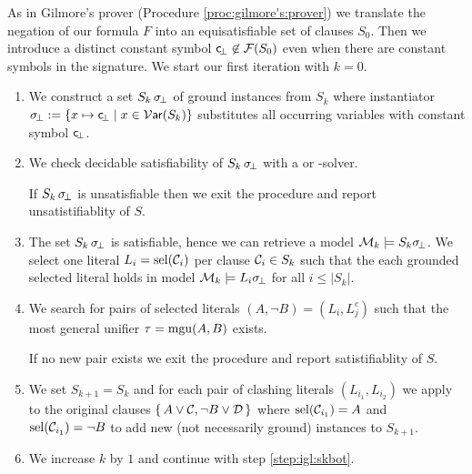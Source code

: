 \begin{procedure}\label{proc:inst:gen:loop}
	As in Gilmore's prover (Procedure \ref{proc:gilmore's:prover}) 
	we translate the negation of our formula $F$ into an equisatisfiable set of clauses 
	$S_0$. Then we introduce a distinct constant symbol 
	${\mathsf c}\!_\bot\not\in{\mathcal F}(S_0)$ even when there are constant symbols in the signature. 
	We start our first iteration with $k=0$.
	
	\begin{enumerate}
		\item\label{step:igl:skbot}
		We construct a set $S_{k}\,\sigma\!_\bot$ of ground instances from $S_k$
		where instantiator $\sigma\!_\bot := \{ x\mapsto {\mathsf c}\!_\bot \mid x\in\operatorname{\mathcal{V}\mathsf{ar}}(S_k) \} $ 
		substitutes all occurring variables with constant symbol ${\mathsf c}\!_\bot$.
%		
		\item\label{step:igl:sksat} We check decidable satisfiability of $S_k\,\sigma\!_\bot$ with a \SAT or \SMT-solver.
		
		If $S_k\,\sigma\!_\bot$ is unsatisfiable then we exit the procedure and report {\myem unsatistifiablity of $S$}.
		
		\item\label{step:igl:model} The set $S_k\,\sigma\!_\bot$ is satisfiable, hence we can retrieve a model ${\mathcal M}_k \models S_k\sigma\!_\bot$.
		We select one literal $L_i = \operatorname{sel}({\mathcal C}_i)$ per clause ${\mathcal C}_i \in S_k$ 
		such that the each grounded selected literal holds in model
		${\mathcal M}_k\models L_i\sigma\!_\bot$ for all $i\leq | S_k |$.
		
		\item\label{step:igl:clashes} We search for pairs of selected literals $(A, \lnot B) = (L_i, L_j^c)$
		such that the most general unifier $\tau = \operatorname{mgu}(A,B)$ exists.
		
		If no new pair exists we exit the procedure and report {\myem satistifiablity of $S$}.
		
		\item We set $S_{k+1} = S_k$ and for each pair of clashing literals $(L_{i_1}, L_{i_2})$ 
		we apply \InstGen to the original clauses $\{\,A\lor{\mathcal C},\lnot B\lor{\mathcal D}\,\}$
		where $\operatorname{sel}({\mathcal C}_{i_1}) = A$ and $\operatorname{sel}({\mathcal C}_{i_1})=\lnot B$
		to add new (not necessarily ground) instances to $S_{k+1}$.
		
		\item We increase $k$ by $1$ and continue with step \ref{step:igl:skbot}. 
		
	\end{enumerate}
	


\end{procedure}
